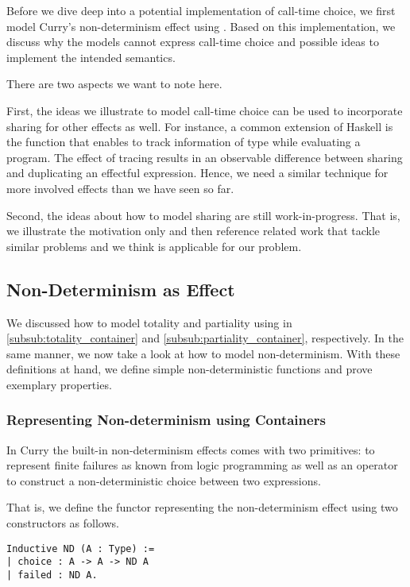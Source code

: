 Before we dive deep into a potential implementation of call-time
choice, we first model Curry's non-determinism effect using
.
Based on this implementation, we discuss why the models cannot express
call-time choice and possible ideas to implement the intended semantics.

There are two aspects we want to note here.

First, the ideas we illustrate to model call-time choice can be used
to incorporate sharing for other effects as well.
For instance, a common extension of Haskell is the function
 that enables to track information of type 
while evaluating a program.
The effect of tracing results in an observable difference between
sharing and duplicating an effectful expression.
Hence, we need a similar technique for more involved effects than we
have seen so far.

Second, the ideas about how to model sharing are still
work-in-progress.
That is, we illustrate the motivation only and then reference related work that
tackle similar problems and we think is applicable for our problem.

\subsection{Non-Determinism as Effect}

We discussed how to model totality and partiality using  in
\autoref{subsub:totality_container} and
\autoref{subsub:partiality_container}, respectively.
In the same manner, we now take a look at how to model
non-determinism.
With these definitions at hand, we define simple non-deterministic
functions and prove exemplary properties.

\subsubsection{Representing Non-determinism using Containers}
In Curry the built-in non-determinism effects comes with two
primitives:  to represent finite failures as known from
logic programming as well as an operator  to
construct a non-deterministic choice between two expressions.

That is, we define the functor representing the non-determinism effect
using two constructors as follows. 

\begin{verbatim}
Inductive ND (A : Type) :=
| choice : A -> A -> ND A
| failed : ND A.
\end{verbatim}

